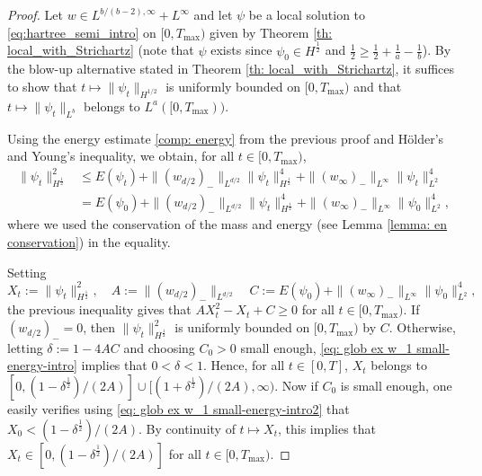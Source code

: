 \documentclass[12pt]{article}
\theoremstyle{plain}
\begin{document}
\begin{proof}
   Let $w\in L^{b/(b-2),\infty}+L^\infty$ and let $\psi$ be a local solution to \eqref{eq:hartree_semi_intro} on $[0,T_{\max})$ given by Theorem \ref{th: local_with_Strichartz} (note that $\psi$ exists since $\psi_0\in H^{\frac12}$ and $\frac12\ge\frac12+\frac1a-\frac1b$). By the blow-up alternative stated in Theorem \ref{th: local_with_Strichartz}, it suffices to show that $t\mapsto\|\psi_t\|_{H^{1/2}}$ is uniformly bounded on $[0,T_{\max})$ and that $t\mapsto\|\psi_t\|_{L^b}$ belongs to $L^a([0,T_{\max}))$.
   
   Using the energy estimate \eqref{comp: energy} from the previous proof and Hölder's and Young's inequality, we obtain, for all $t\in[0,T_{\max})$,
   \begin{align*}
       \|\psi_t\|^2_{H^\frac12}&\le E(\psi_t)+\|(w_{d/2})_-\|_{L^{d/2}}\|\psi_t\|^4_{H^\frac12}+\|(w_\infty)_-\|_{L^\infty}\|\psi_t\|^4_{L^2}\\
       &=E(\psi_0)+\|(w_{d/2})_-\|_{L^{d/2}}\|\psi_t\|^4_{H^\frac12}+\|(w_\infty)_-\|_{L^\infty}\|\psi_0\|^4_{L^2},
   \end{align*}
where we used the conservation of the mass and energy (see Lemma \ref{lemma: en conservation}) in the equality.

Setting
\begin{equation*}
    X_t:=\|\psi_t\|^2_{H^\frac12}, \quad A:=\|(w_{d/2})_-\|_{L^{d/2}}\quad  C:=E(\psi_0)+\|(w_\infty)_-\|_{L^\infty}\|\psi_0\|^4_{L^2},
\end{equation*}
the previous inequality gives that $AX_t^2-X_t+C\ge0$ for all $t\in[0,T_{\max})$. If $(w_{d/2})_-=0$, then $\|\psi_t\|^2_{H^\frac12}$ is uniformly bounded on $[0,T_{\max})$ by $C$. Otherwise, letting $\delta:=1-4AC$ and choosing $C_0>0$ small enough, \eqref{eq: glob ex w_1 small-energy-intro} implies that $0<\delta<1$. Hence, for all $t\in[0,T]$, $X_t$ belongs to $[0,(1-\delta^{\frac12})/(2A)]\cup[(1+\delta^{\frac12})/(2A),\infty)$. Now if $C_0$ is small enough, one easily verifies using \eqref{eq: glob ex w_1 small-energy-intro2} that $X_0<(1-\delta^{\frac12})/(2A)$. By continuity of $t\mapsto X_t$, this implies that $X_t\in [0,(1-\delta^{\frac12})/(2A)]$ for all $t\in[0,T_{\max})$.


\end{proof}
\end{document}
